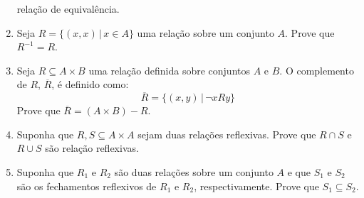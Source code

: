 \documentclass[11pt,a4paper]{report}
\begin{document}
\begin{enumerate}
	      rela\c{c}\~ao de equival\^encia.
        \item Seja $R = \{(x,x)\,|\,x\in A\}$ uma rela\c{c}\~ao sobre um
          conjunto $A$. Prove que $R^{-1} = R$.
        \item Seja $R\subseteq A\times B$ uma rela\c{c}\~ao definida sobre
          conjuntos $A$ e $B$. O complemento de $R$, $\overline{R}$, \'e
          definido como:
          \[
          \overline{R} = \{(x,y)\,|\,\neg xRy\}
          \]
          Prove que $\overline{R} = (A\times B) - R$.
          \item Suponha que $R,S\subseteq A\times A$ sejam duas rela\c{c}\~oes
            reflexivas. Prove que $R\cap S$ e $R\cup S$ s\~ao rela\c{c}\~ao
            reflexivas.
         \item Suponha que $R_1$ e $R_2$ s\~ao duas rela\c{c}\~oes
           sobre um conjunto $A$ e que $S_1$ e $S_2$ s\~ao os fechamentos
           reflexivos de $R_1$ e $R_2$, respectivamente. Prove que $S_1
           \subseteq S_2$.
\end{enumerate}
\end{document}
